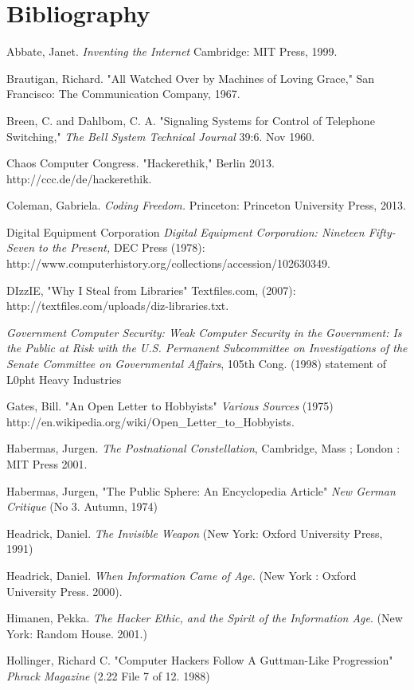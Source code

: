 \documentclass[11pt]{article}
\begin{document}
\section{Bibliography}
\begin{hangparas}{15pt}{1}
Abbate, Janet. \emph{Inventing the Internet} Cambridge: MIT Press, 1999.

Brautigan, Richard. "All Watched Over by Machines of Loving Grace," San Francisco: The Communication Company, 1967.

Breen, C. and Dahlbom, C. A. "Signaling Systems for Control of Telephone Switching," \emph{The Bell System Technical Journal} 39:6. Nov 1960.

Chaos Computer Congress. "Hackerethik," Berlin 2013. http://ccc.de/de/hackerethik.

Coleman, Gabriela. \emph{Coding Freedom.} Princeton: Princeton University Press, 2013.

Digital Equipment Corporation \emph{Digital Equipment Corporation: Nineteen Fifty-Seven to the Present,} DEC Press (1978): http://www.computerhistory.org/collections/accession/102630349.

DIzzIE, "Why I Steal from Libraries" Textfiles.com, (2007): http://textfiles.com/uploads/diz-libraries.txt.

\emph{Government Computer Security: Weak Computer Security in the Government: Is the Public at Risk with the U.S. Permanent Subcommittee on Investigations of the Senate Committee on Governmental Affairs}, 105th Cong. (1998) statement of L0pht Heavy Industries

Gates, Bill. "An Open Letter to Hobbyists" \emph{Various Sources} (1975) http://en.wikipedia.org/wiki/Open\_Letter\_to\_Hobbyists.

Habermas, Jurgen. \emph{The Postnational Constellation}, Cambridge, Mass ; London : MIT Press 2001.

Habermas, Jurgen, "The Public Sphere: An Encyclopedia Article" \emph{New German Critique} (No 3. Autumn, 1974) 

Headrick, Daniel. \emph{The Invisible Weapon} (New York: Oxford University Press, 1991)

Headrick, Daniel. \emph{When Information Came of Age.} (New York : Oxford University Press. 2000).

Himanen, Pekka. \emph{The Hacker Ethic, and the Spirit of the Information Age}. (New York: Random House. 2001.)

Hollinger, Richard C. "Computer Hackers Follow A Guttman-Like Progression"  \emph{Phrack Magazine} (2.22 File 7 of 12. 1988)


\end{hangparas}
\end{document}
